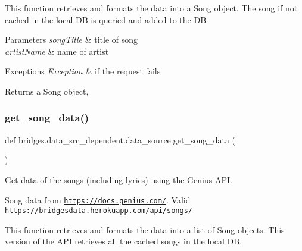 This function retrieves and formats the data into a Song object. The song if not cached in the local DB is queried and added to the DB


\begin{DoxyParams}{Parameters}
{\em song\+Title} & title of song \\
\hline
{\em artist\+Name} & name of artist\\
\hline
\end{DoxyParams}

\begin{DoxyExceptions}{Exceptions}
{\em Exception} & if the request fails\\
\hline
\end{DoxyExceptions}
\begin{DoxyReturn}{Returns}
a Song object, 
\end{DoxyReturn}
\mbox{\label{namespacebridges_1_1data__src__dependent_1_1data__source_abf7f1f53dc13383fa296cb597e4a7ee0}} 
\subsubsection{\texorpdfstring{get\+\_\+song\+\_\+data()}{get\_song\_data()}}
{\footnotesize\ttfamily def bridges.\+data\+\_\+src\+\_\+dependent.\+data\+\_\+source.\+get\+\_\+song\+\_\+data (\begin{DoxyParamCaption}{ }\end{DoxyParamCaption})}



Get data of the songs (including lyrics) using the Genius A\+PI. 

Song data from \href{https://docs.genius.com/}{\tt https\+://docs.\+genius.\+com/}. Valid \href{https://bridgesdata.herokuapp.com/api/songs/}{\tt https\+://bridgesdata.\+herokuapp.\+com/api/songs/}

This function retrieves and formats the data into a list of Song objects. This version of the A\+PI retrieves all the cached songs in the local DB.


